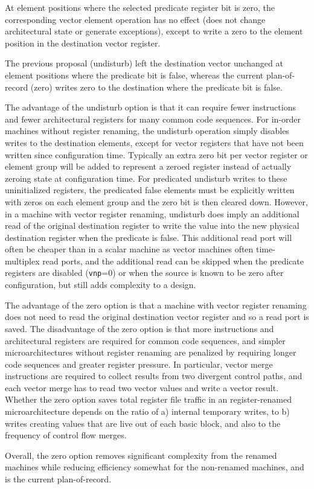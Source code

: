 At element positions where the selected predicate register bit is
zero, the corresponding vector element operation has no effect (does
not change architectural state or generate exceptions), except to
write a zero to the element position in the destination vector
register.

\begin{discussion}
  The previous proposal (undisturb) left the destination vector
  unchanged at element positions where the predicate bit is false,
  whereas the current plan-of-record (zero) writes zero to the
  destination where the predicate bit is false.

  The advantage of the undisturb option is that it can require fewer
  instructions and fewer architectural registers for many common code
  sequences.  For in-order machines without register renaming, the
  undisturb operation simply disables writes to the destination
  elements, except for vector registers that have not been written
  since configuration time. Typically an extra zero bit per vector
  register or element group will be added to represent a zeroed
  register instead of actually zeroing state at configuration time.
  For predicated undisturb writes to these uninitialized registers,
  the predicated false elements must be explicitly written with zeros
  on each element group and the zero bit is then cleared down.
  However, in a machine with vector register renaming, undisturb does
  imply an additional read of the original destination register to
  write the value into the new physical destination register when the
  predicate is false.  This additional read port will often be cheaper
  than in a scalar machine as vector machines often time-multiplex
  read ports, and the additional read can be skipped when the
  predicate registers are disabled ({\tt vnp}=0) or when the source is
  known to be zero after configuration, but still adds complexity to a
  design.

  The advantage of the zero option is that a machine with vector
  register renaming does not need to read the original destination
  vector register and so a read port is saved.  The disadvantage of
  the zero option is that more instructions and architectural
  registers are required for common code sequences, and simpler
  microarchitectures without register renaming are penalized by
  requiring longer code sequences and greater register pressure.  In
  particular, vector merge instructions are required to collect
  results from two divergent control paths, and each vector merge has
  to read two vector values and write a vector result.  Whether the
  zero option saves total register file traffic in an register-renamed
  microarchitecture depends on the ratio of a) internal temporary
  writes, to b) writes creating values that are live out of each basic
  block, and also to the frequency of control flow merges.

  Overall, the zero option removes significant complexity from the
  renamed machines while reducing efficiency somewhat for the
  non-renamed machines, and is the current plan-of-record.
\end{discussion}

